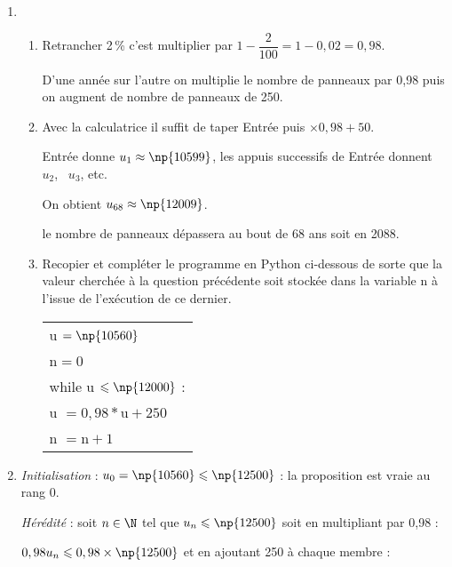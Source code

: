 \begin{enumerate}
\item 
	\begin{enumerate}
		\item  %
Retrancher 2\,\% c'est multiplier par $1 - \dfrac{2}{100} = 1 - 0,02 = 0,98$.

D'une année sur l'autre on multiplie le nombre de panneaux par 0,98 puis on augment de nombre de panneaux de 250.
		\item  %
		
Avec la calculatrice il suffit de taper  Entrée puis $\times 0,98 + 50$.

Entrée donne $u_1 \approx \np{10599}$, les appuis successifs de Entrée donnent $u_2$, \, $u_3$, etc.

On obtient $u_{68} \approx \np{12009}$.

le nombre de panneaux dépassera  au bout de 68 ans soit en 2088.
		\item  Recopier et compléter le programme en Python ci-dessous de sorte que la valeur
cherchée à la question précédente soit stockée dans la variable n à l'issue de l'exécution de ce dernier.
\begin{center}
\begin{tabular}{|l|}\hline
u $= \np{10560}$\\
n$ =0$\\
while  u $\leqslant \np{12000}$ :\\
\qquad u $= 0,98*\text{u} + 250$  \\
\qquad n $= \text{n} + 1$\\ \hline
\end{tabular}
\end{center}

	\end{enumerate}
\item %
\emph{Initialisation }: $u_0 = \np{10560} \leqslant \np{12500}$ : la proposition est vraie au rang 0.

\emph{Hérédité} : soit $n \in \N$ tel que $u_n \leqslant \np{12500}$ soit en multipliant par 0,98 :

$0,98u_n \leqslant 0,98 \times \np{12500}$ et en ajoutant 250 à chaque membre :


\end{enumerate}
